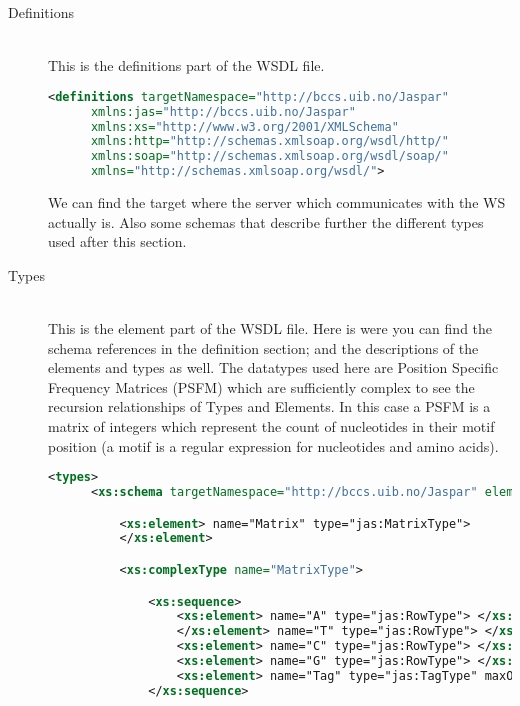 \documentclass[a4paper,10pt]{article}
\begin{document}
    \begin{description}
      \item[Definitions] \hfill \\
      This is the definitions part of the WSDL file.

      \begin{lstlisting}[language=XML]
      <definitions targetNamespace="http://bccs.uib.no/Jaspar"
      xmlns:jas="http://bccs.uib.no/Jaspar"
      xmlns:xs="http://www.w3.org/2001/XMLSchema"
      xmlns:http="http://schemas.xmlsoap.org/wsdl/http/"
      xmlns:soap="http://schemas.xmlsoap.org/wsdl/soap/"
      xmlns="http://schemas.xmlsoap.org/wsdl/">
      \end{lstlisting}

      We can find the target where the server which communicates with the WS actually is. Also some schemas that describe further the different types used after this section.

      \item[Types] \hfill \\

      This is the element part of the WSDL file. Here is were you can find the schema references in the definition section; and the descriptions of the elements and types as well. The datatypes used here are Position Specific Frequency Matrices (PSFM) \cite{pssm} which are sufficiently complex to see the recursion relationships of Types and Elements. In this case a PSFM is a matrix of integers which represent the count of nucleotides in their motif position (a motif is a regular expression for nucleotides and amino acids).

      \begin{lstlisting}[language=XML]
      <types>
      <xs:schema targetNamespace="http://bccs.uib.no/Jaspar" elementFormDefault="qualified" attributeFormDefault="unqualified" xmlns:ns1="http://schemas.xmlsoap.org/soap/encoding/" >

	      <xs:element> name="Matrix" type="jas:MatrixType"> 
	      </xs:element>

	      <xs:complexType name="MatrixType">

		      <xs:sequence>
			      <xs:element> name="A" type="jas:RowType"> </xs:element>
			      </xs:element> name="T" type="jas:RowType"> </xs:element>
			      <xs:element> name="C" type="jas:RowType"> </xs:element>
			      <xs:element> name="G" type="jas:RowType"> </xs:element>
			      <xs:element> name="Tag" type="jas:TagType" maxOccurs="unbounded"> </xs:element>
		      </xs:sequence>


\end{lstlisting}
\end{description}
\end{document}
